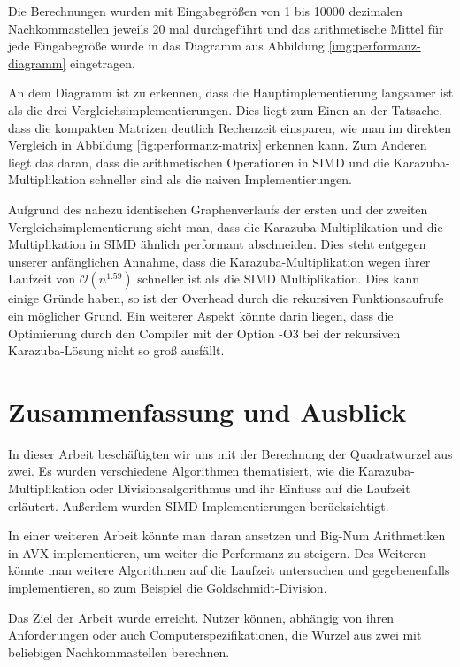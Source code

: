 \documentclass[course=erap]{aspdoc}
\begin{document}
Die Berechnungen wurden mit Eingabegrößen von 1 bis 10000 dezimalen Nachkommastellen jeweils 20 mal durchgeführt und das arithmetische Mittel für jede Eingabegröße wurde in das Diagramm aus Abbildung \ref{img:performanz-diagramm} 
eingetragen.

An dem Diagramm ist zu erkennen, dass die Hauptimplementierung langsamer ist als die drei Vergleichsimplementierungen. Dies liegt zum Einen an der Tatsache, dass die kompakten Matrizen deutlich Rechenzeit einsparen, wie man im direkten Vergleich in Abbildung \ref{fig:performanz-matrix} erkennen kann. Zum 
Anderen liegt das daran, dass die arithmetischen Operationen in SIMD und die Karazuba-Multiplikation schneller sind als die naiven Implementierungen. \par
Aufgrund des nahezu identischen Graphenverlaufs der ersten und der zweiten Vergleichsimplementierung sieht man, dass die Karazuba-Multiplikation und die Multiplikation in SIMD ähnlich performant abschneiden. Dies steht 
entgegen unserer anfänglichen Annahme, dass die Karazuba-Multiplikation wegen ihrer Laufzeit von $\mathcal{O}(n^{1.59})$ schneller ist als die SIMD Multiplikation. Dies kann einige Gründe haben, so ist der Overhead durch die rekursiven 
Funktionsaufrufe ein möglicher Grund. Ein weiterer Aspekt könnte darin liegen, dass die Optimierung durch den Compiler mit der Option -O3 bei der rekursiven Karazuba-Lösung nicht so groß ausfällt.

\section{Zusammenfassung und Ausblick} \label{sec:zusammenfassung}
In dieser Arbeit beschäftigten wir uns mit der Berechnung der Quadratwurzel aus zwei. Es wurden verschiedene Algorithmen thematisiert, wie die Karazuba-Multiplikation oder Divisionsalgorithmus und ihr Einfluss auf die Laufzeit erläutert. Außerdem wurden SIMD Implementierungen berücksichtigt. \par
In einer weiteren Arbeit könnte man daran ansetzen und Big-Num Arithmetiken in AVX implementieren, um weiter die Performanz zu steigern. Des Weiteren könnte man weitere Algorithmen auf die Laufzeit untersuchen und gegebenenfalls implementieren, so zum Beispiel die Goldschmidt-Division. \par
Das Ziel der Arbeit wurde erreicht. Nutzer können, abhängig von ihren Anforderungen oder auch Computerspezifikationen, die Wurzel aus zwei mit beliebigen Nachkommastellen berechnen.


{}
\end{document}
